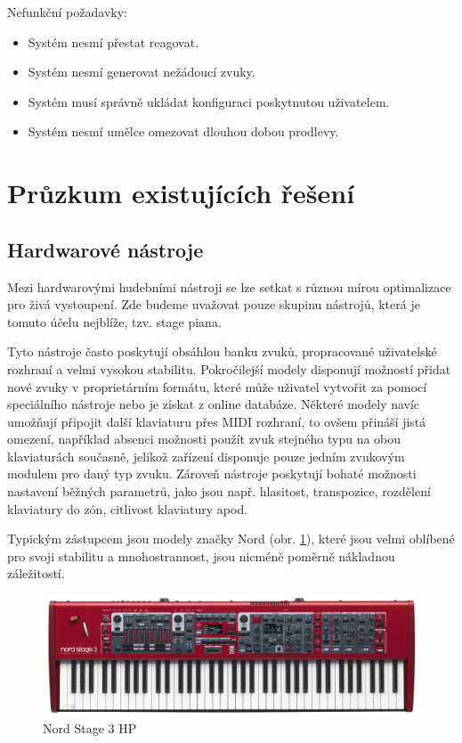 \documentclass[thesis=M,czech]{FITthesis}[2019/03/06]
\begin{document}
	Nefunkční požadavky:
	\begin{itemize}
		\item Systém nesmí přestat reagovat.
		\item Systém nesmí generovat nežádoucí zvuky.
		\item Systém musí správně ukládat konfiguraci poskytnutou uživatelem.
		\item Systém nesmí umělce omezovat dlouhou dobou prodlevy.
	\end{itemize}
	
	\section{Průzkum existujících řešení}
	\subsection{Hardwarové nástroje}
	Mezi hardwarovými hudebními nástroji se lze setkat s různou mírou optimalizace pro živá vystoupení.
	Zde budeme uvažovat pouze skupinu nástrojů, která je tomuto účelu nejblíže, tzv. stage piana.
	
	Tyto nástroje často poskytují obsáhlou banku zvuků, propracované uživatelské rozhraní a velmi vysokou stabilitu.
	Pokročilejší modely disponují možností přidat nové zvuky v proprietárním formátu, které může uživatel vytvořit za pomocí speciálního nástroje nebo je získat z online databáze. Některé modely navíc umožňují připojit další klaviaturu přes MIDI rozhraní, to ovšem přináší jistá omezení,
	například absenci možnosti použít zvuk stejného typu na obou klaviaturách současně, jelikož zařízení disponuje pouze jedním zvukovým modulem
	pro daný typ zvuku.
	Zároveň nástroje poskytují bohaté možnosti nastavení běžných parametrů, jako jsou např. hlasitost, transpozice, rozdělení klaviatury do zón,
	citlivost klaviatury apod.
	
	Typickým zástupcem jsou modely značky Nord (obr. \ref{fig:HardwareStagepiano}), které jsou velmi oblíbené pro svoji stabilitu a mnohostrannost, jsou nicméně poměrně nákladnou záležitostí.
	
	\begin{figure}[H]
		\centering
		\includegraphics[width=1\textwidth]{HardwareStagepiano}
		\caption[Nord Stage 3 HP]{Nord Stage 3 HP}\label{fig:HardwareStagepiano}
	\end{figure}
\end{document}
